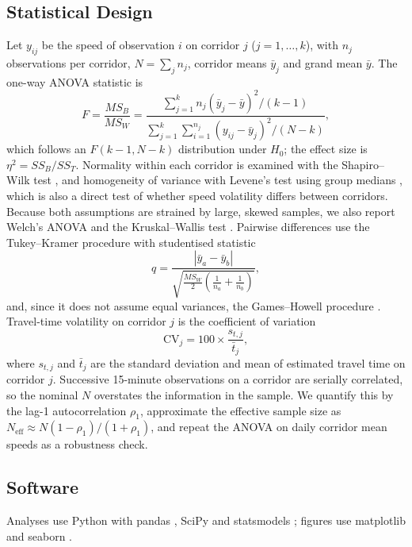 \documentclass[conference]{IEEEtran}
\begin{document}
\subsection{Statistical Design}
Let $y_{ij}$ be the speed of observation $i$ on corridor $j$ ($j = 1,\dots,k$), with $n_j$ observations per corridor, $N = \sum_j n_j$, corridor means $\bar{y}_j$ and grand mean $\bar{y}$. The one-way ANOVA statistic is
\begin{equation}
F = \frac{MS_B}{MS_W} = \frac{\sum_{j=1}^{k} n_j(\bar{y}_j - \bar{y})^2 / (k-1)}{\sum_{j=1}^{k}\sum_{i=1}^{n_j}(y_{ij} - \bar{y}_j)^2 / (N-k)},
\label{eq:anova}
\end{equation}
which follows an $F(k-1, N-k)$ distribution under $H_0$; the effect size is $\eta^2 = SS_B / SS_T$. Normality within each corridor is examined with the Shapiro--Wilk test \cite{shapiro1965analysis}, and homogeneity of variance with Levene's test using group medians \cite{levene1960robust}, which is also a direct test of whether speed volatility differs between corridors. Because both assumptions are strained by large, skewed samples, we also report Welch's ANOVA \cite{welch1951comparison} and the Kruskal--Wallis test \cite{kruskal1952use}. Pairwise differences use the Tukey--Kramer procedure \cite{tukey1949comparing} with studentised statistic
\begin{equation}
q = \frac{|\bar{y}_a - \bar{y}_b|}{\sqrt{\tfrac{MS_W}{2}\left(\tfrac{1}{n_a} + \tfrac{1}{n_b}\right)}},
\label{eq:tukey}
\end{equation}
and, since it does not assume equal variances, the Games--Howell procedure \cite{gameshowell1976pairwise}. Travel-time volatility on corridor $j$ is the coefficient of variation
\begin{equation}
\mathrm{CV}_j = 100 \times \frac{s_{t,j}}{\bar{t}_j},
\label{eq:cv}
\end{equation}
where $s_{t,j}$ and $\bar{t}_j$ are the standard deviation and mean of estimated travel time on corridor $j$. Successive 15-minute observations on a corridor are serially correlated, so the nominal $N$ overstates the information in the sample. We quantify this by the lag-1 autocorrelation $\rho_1$, approximate the effective sample size as $N_{\mathrm{eff}} \approx N(1-\rho_1)/(1+\rho_1)$, and repeat the ANOVA on daily corridor mean speeds as a robustness check.

\subsection{Software}
Analyses use Python with pandas \cite{mckinney2010data}, SciPy \cite{virtanen2020scipy} and statsmodels \cite{seabold2010statsmodels}; figures use matplotlib \cite{hunter2007matplotlib} and seaborn \cite{waskom2021seaborn}.
\end{document}
